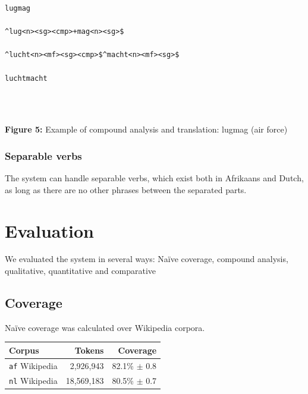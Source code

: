 \documentclass[a0,landscape]{a0poster}
\begin{document}
\begin{multicols}{4}
\begin{center}
\begin{minipage}[b]{26cm}
\begin{small}
\begin{verbatim}
lugmag

^lug<n><sg><cmp>+mag<n><sg>$

^lucht<n><mf><sg><cmp>$^macht<n><mf><sg>$

luchtmacht
\end{verbatim}
\end{small}
\end{minipage}\\
\end{center}
~\\
\textbf{Figure 5:} Example of compound analysis and translation: lugmag (air force)



\subsubsection{Separable verbs}

\noindent
The system can handle separable verbs, which exist both in Afrikaans and Dutch, as
long as there are no other phrases between the separated parts.\\

\section{Evaluation}
\noindent
We evaluated the system in several ways: Naïve coverage, compound analysis, qualitative, quantitative and comparative

\subsection{Coverage}

\noindent
Naïve coverage was calculated over Wikipedia corpora.\\


\begin{minipage}[b]{25cm}
\begin{center}
  \begin{tabular}{|l|r|r|}
   \hline
   {\bf Corpus}           & {\bf Tokens}    & {\bf Coverage}\\
   \hline
   {\tt af} Wikipedia     & 2,926,943       & 82.1\% $\pm$ 0.8 \\
   \hline
   {\tt nl} Wikipedia     & 18,569,183      & 80.5\% $\pm$ 0.7 \\
   \hline
  \end{tabular}
    

\end{center}
\end{minipage}
\end{multicols}
\end{document}
